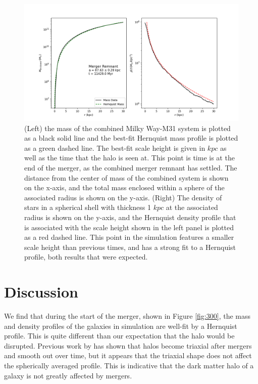 \documentclass[linenumbers]{aastex631}
\begin{document}
\begin{figure}
    \centering
    \includegraphics[width=\textwidth]{Snap800Fits.png}
    \caption{(Left) the mass of the combined Milky Way-M31 system is plotted as a black solid line and the best-fit Hernquist mass profile is plotted as a green dashed line. The best-fit scale height is given in $kpc$ as well as the time that the halo is seen at. This point is time is at the end of the merger, as the combined merger remnant has settled. The distance from the center of mass of the combined system is shown on the x-axis, and the total mass enclosed within a sphere of the associated radius is shown on the y-axis. (Right) The density of stars in a spherical shell with thickness 1 $kpc$ at the associated radius is shown on the y-axis, and the Hernquist density profile that is associated with the scale height shown in the left panel is plotted as a red dashed line. This point in the simulation features a smaller scale height than previous times, and has a strong fit to a Hernquist profile, both results that were expected.}
    \label{fig:800}
\end{figure}

\section{Discussion}
We find that during the start of the merger, shown in Figure \ref{fig:300}, the mass and density profiles of the galaxies in simulation are well-fit by a Hernquist profile. This is quite different than our expectation that the halo would be disrupted. Previous work by \cite{Despali} has shown that halos become triaxial after mergers and smooth out over time, but it appears that the triaxial shape does not affect the spherically averaged profile. This is indicative that the dark matter halo of a galaxy is not greatly affected by 
mergers.
\end{document}

